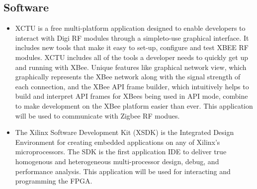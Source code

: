 \documentclass[conference]{IEEEtran}
\begin{document}
\subsection{Software}
\begin{itemize}
\item XCTU is a free multi-platform application designed to enable developers to interact with Digi RF modules through a simpleto-use graphical interface. It includes new tools that make it easy to set-up, configure and test XBEE RF modules. XCTU includes all of the tools a developer needs to quickly get up and running with XBee. Unique features like graphical network view, which graphically represents the XBee network along with the signal strength of each connection, and the XBee API frame builder, which intuitively helps to build and interpret API frames for XBees being used in API mode, combine to make development on the XBee platform easier than ever. This application will be used to communicate with Zigbee RF modues.
\item The Xilinx Software Development Kit (XSDK) is the Integrated Design Environment for creating embedded applications on any of Xilinx's microprocessors. The SDK is the first application IDE to deliver true homogenous and heterogeneous multi-processor design, debug, and performance analysis. This application will be used for interacting and programming the FPGA.
\end{itemize}




\end{document}
